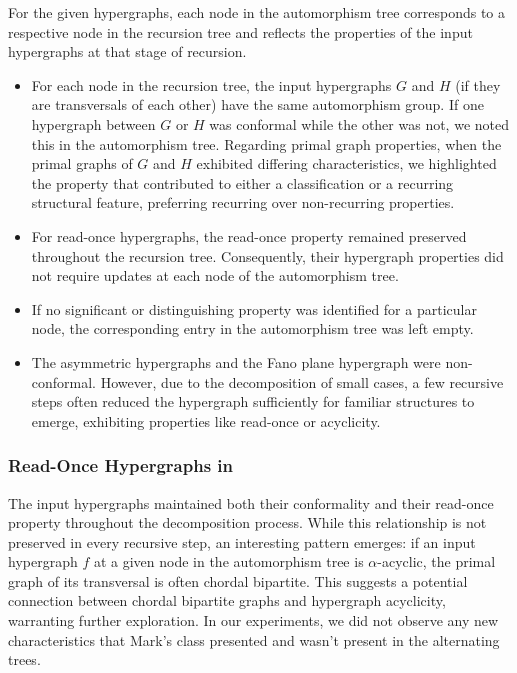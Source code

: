 For the given hypergraphs, each node in the automorphism tree corresponds to a respective node in the \FKA{} recursion tree and reflects the properties of the input hypergraphs at that stage of recursion.
\begin{itemize}
\item For each node in the \FKA{} recursion tree, the input hypergraphs $G$ and $H$ (if they are transversals of each other) have the same automorphism group. If one hypergraph between $G$ or $H$ was conformal while the other was not, we noted this in the automorphism tree. Regarding primal graph properties, when the primal graphs of $G$ and $H$ exhibited differing characteristics, we highlighted the property that contributed to either a classification or a recurring structural feature, preferring recurring over non-recurring properties.
\item For read-once hypergraphs, the read-once property remained preserved throughout the recursion tree. Consequently, their hypergraph properties did not require updates at each node of the automorphism tree.
\item If no significant or distinguishing property was identified for a particular node, the corresponding entry in the automorphism tree was left empty.
\item The asymmetric hypergraphs and the Fano plane hypergraph were non-conformal. However, due to the decomposition of small cases, a few recursive steps often reduced the hypergraph sufficiently for familiar structures to emerge, exhibiting properties like read-once or acyclicity.
\end{itemize}

\subsubsection*{Read-Once Hypergraphs in \FKA}

The input hypergraphs maintained both their conformality and their read-once property throughout the decomposition process. While this relationship is not preserved in every recursive step, an interesting pattern emerges: if an input hypergraph $f$ at a given node in the automorphism tree is $\alpha$-acyclic, the primal graph of its transversal is often chordal bipartite. This suggests a potential connection between chordal bipartite graphs and hypergraph acyclicity, warranting further exploration. In our experiments, we did not observe any new characteristics that Mark's class presented and wasn't present in the alternating trees.

